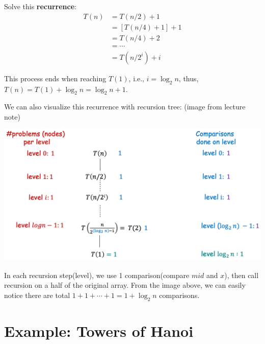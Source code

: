 \documentclass[11pt, a4paper]{COMP3711}
\begin{document}
\begin{spacing}{1.5}
    Solve this {\bf recurrence}:
    \begin{align*}
        T(n) &= T(n/2) + 1\\
            &= [T(n/4) + 1] + 1\\
            &= T(n/4) + 2\\
            &=\cdots\\
            &=T(n/2^{i}) + i
    \end{align*}

    This process ends when reaching $T(1)$, i.e., 
    $i=\log_2 n$, thus, $T(n)=T(1)+\log_2 n=\log_2 n + 1$.

    We can also visualize this recurrence with recursion tree:
    (image from lecture note)
    \begin{center}
        \includegraphics[scale=0.35]{images/02-bs-tree.png}
    \end{center}

    In each recursion step(level), we use 1 comparison(compare 
    $mid$ and $x$), then call recursion on a half 
    of the original array. From the image above, 
    we can easily notice there are total 
    $1+1+\cdots+1=1+\log_2 n$ comparisons.

    \section{Example: Towers of Hanoi}


\end{spacing}
\end{document}
